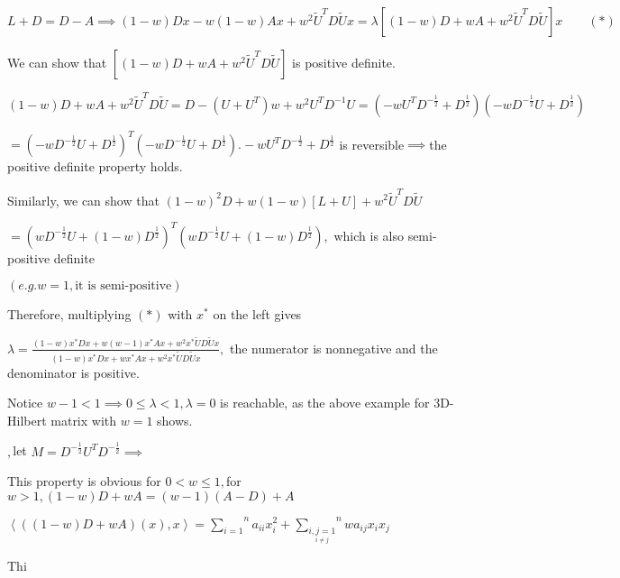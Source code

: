 \documentclass{article}
\begin{document}
$L+D=D-A\implies \left( 1-w\right) Dx-w\left( 1-w\right) Ax+w^{2}\tilde{U}%
^{T}D\tilde{U}x=\lambda \left[ \left( 1-w\right) D+wA+w^{2}\tilde{U}^{T}D%
\tilde{U}\right] x\qquad \left( \ast \right) $

We can show that $\left[ \left( 1-w\right) D+wA+w^{2}\tilde{U}^{T}D\tilde{U}%
\right] $ is positive definite. 

\bigskip $\left( 1-w\right) D+wA+w^{2}\tilde{U}^{T}D\tilde{U}=D-\left(
U+U^{T}\right) w+w^{2}U^{T}D^{-1}U=\left( -wU^{T}D^{-\frac{1}{2}}+D^{\frac{1%
}{2}}\right) \left( -wD^{-\frac{1}{2}}U+D^{\frac{1}{2}}\right) $

$=\left( -wD^{-\frac{1}{2}}U+D^{\frac{1}{2}}\right) ^{T}\left( -wD^{-\frac{1%
}{2}}U+D^{\frac{1}{2}}\right) .-wU^{T}D^{-\frac{1}{2}}+D^{\frac{1}{2}}$ is
reversible$\implies $the positive definite property holds.

Similarly, we can show that $\left( 1-w\right) ^{2}D+w\left( 1-w\right) %
\left[ L+U\right] +w^{2}\tilde{U}^{T}D\tilde{U}$

$=\left( wD^{-\frac{1}{2}}U+\left( 1-w\right) D^{\frac{1}{2}}\right)
^{T}\left( wD^{-\frac{1}{2}}U+\left( 1-w\right) D^{\frac{1}{2}}\right) ,$%
which is also semi-positive definite

$\left( e.g.w=1,\text{it is semi-positive}\right) $

Therefore, multiplying $\left( \ast \right) $ with $x^{\ast }$ on the left
gives

$\lambda =\frac{\left( 1-w\right) x^{\ast }Dx+w\left( w-1\right) x^{\ast
}Ax+w^{2}x^{\ast }\tilde{U}D\tilde{U}x}{\left( 1-w\right) x^{\ast
}Dx+wx^{\ast }Ax+w^{2}x^{\ast }\tilde{U}D\tilde{U}x},$ the numerator is
nonnegative and the denominator is positive.

Notice $w-1<1\implies 0\leq \lambda <1,\lambda =0$ is reachable, as the
above example for 3D-Hilbert matrix with $w=1$ shows.

\bigskip 

$,$let $M=D^{-\frac{1}{2}}U^{T}D^{-\frac{1}{2}}\implies $

This property is obvious for $0<w\leq 1,$for $w>1,\left( 1-w\right)
D+wA=\left( w-1\right) \left( A-D\right) +A$

$\left\langle \left( \left( 1-w\right) D+wA\right) \left( x\right)
,x\right\rangle =\overset{n}{\underset{i=1}{\sum }}a_{ii}x_{i}^{2}+\overset{n%
}{\underset{\underset{i\neq j}{i,j=1}}{\sum }}wa_{ij}x_{i}x_{j}$

Thi

\end{document}
